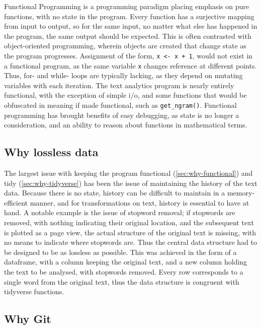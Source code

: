 \documentclass[11pt, a4paper, twoside, titlepage]{report}
\begin{document}
Functional Programming is a programming paradigm placing emphasis on
pure functions, with no state in the program. Every function has a
surjective mapping from input to output, so for the same input, no
matter what else has happened in the program, the same output should
be expected. This is often contrasted with object-oriented
programming, wherein objects are created that change state as the
program progresses. Assignment of the form, \texttt{x <- x +
  1}, would not exist in a functional program, as the same variable
\texttt{x} changes reference at different points. Thus, for-
and while- loops are typically lacking, as they depend on mutating
variables with each iteration. The text analytics program is nearly
entirely functional, with the exception of simple i/o, and some
functions that would be obfuscated in meaning if made functional, such
as \texttt{get_ngram()}. Functional programming has brought
benefits of easy debugging, as state is no longer a consideration, and
an ability to reason about functions in mathematical terms.

\subsection{Why lossless data}

The largest issue with keeping the program functional
(\cref{sec:why-functional}) and tidy (\cref{sec:why-tidyverse})
has been the issue of maintaining the history of the text data.
Because there is no state, history can be difficult to maintain in a
memory-efficient manner, and for transformations on text, history is
essential to have at hand. A notable example is the issue of stopword
removal; if stopwords are removed, with nothing indicating their
original location, and the subsequent text is plotted as a page view,
the actual structure of the original text is missing, with no means to
indicate where stopwords are. Thus the central data structure had to
be designed to be as lossless as possible. This was achieved in the
form of a dataframe, with a column keeping the original text, and a
new column holding the text to be analysed, with stopwords removed.
Every row corresponds to a single word from the original text, thus
the data structure is congruent with tidyverse functions.

\subsection{Why Git}
\end{document}
